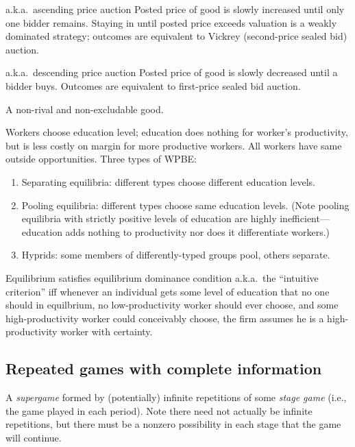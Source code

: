 \documentclass[8pt,letterpaper, landscape]{extarticle} %
\begin{document}
\begin{multicols}{3}
\begin{description}
 a.k.a.\ ascending price auction Posted price of good is slowly increased until only one bidder remains. Staying in until posted price exceeds valuation is a weakly dominated strategy; outcomes are equivalent to Vickrey (second-price sealed bid) auction.

 a.k.a.\ descending price auction Posted price of good is slowly decreased until a bidder buys. Outcomes are equivalent to first-price sealed bid auction.

 A non-rival and non-excludable good.

 Workers choose education level; education does nothing for worker's productivity, but is less costly on margin for more productive workers. All workers have same outside opportunities. Three types of WPBE:
\begin{enumerate}
\item Separating equilibria: different types choose different education levels.
\item Pooling equilibria: different types choose same education levels. (Note pooling equilibria with strictly positive levels of education are highly inefficient---education adds nothing to productivity nor does it differentiate workers.)
\item Hyprids: some members of differently-typed groups pool, others separate.
\end{enumerate}
Equilibrium satisfies equilibrium dominance condition a.k.a.\ the ``intuitive criterion'' iff whenever an individual gets some level of education that no one should in equilbrium, no low-productivity worker should ever choose, and some high-productivity worker could conceivably choose, the firm assumes he is a high-productivity worker with certainty.

\subsection{Repeated games with complete information}
 A \textit{supergame} formed by (potentially) infinite repetitions of some \textit{stage game} (i.e., the game played in each period). Note there need not actually be infinite repetitions, but there must be a nonzero possibility in each stage that the game will continue.


\end{description}
\end{multicols}
\end{document}
